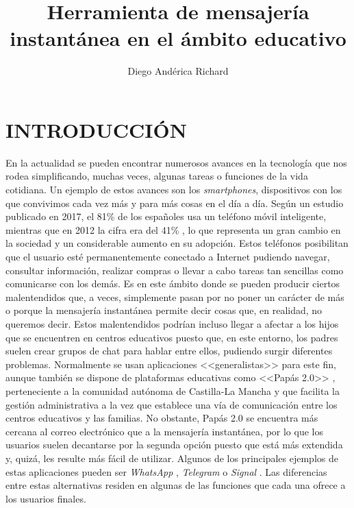 \documentclass{pre-tfg}
\title{Herramienta de mensajería instantánea en el ámbito educativo}
\author{Diego Andérica Richard}
\begin{document}
	
\renewcommand{\tablename}{Tabla}

\maketitle
\tableofcontents

\newpage

\section{INTRODUCCIÓN}

En la actualidad se pueden encontrar numerosos avances en la tecnología que nos rodea simplificando, muchas veces, algunas tareas o funciones de la vida cotidiana. Un ejemplo de estos avances son los \textit{smartphones}, dispositivos con los que convivimos cada vez más y para más cosas en el día a día. Según un estudio publicado en 2017, el 81\% de los españoles usa un teléfono móvil inteligente, mientras que en 2012 la cifra era del 41\% \cite{Justo2017}, lo que representa un gran cambio en la sociedad y un considerable aumento en su adopción. Estos teléfonos posibilitan que el usuario esté permanentemente conectado a Internet pudiendo navegar, consultar información, realizar compras o llevar a cabo tareas tan sencillas como comunicarse con los demás. Es en este ámbito donde se pueden producir ciertos malentendidos que, a veces, simplemente pasan por no poner un carácter de más o porque la mensajería instantánea permite decir cosas que, en realidad, no queremos decir. Estos malentendidos podrían incluso llegar a afectar a los hijos que se encuentren en centros educativos puesto que, en este entorno, los padres suelen crear grupos de chat para hablar entre ellos, pudiendo surgir diferentes problemas. Normalmente se usan aplicaciones <<generalistas>> para este fin, aunque también se dispone de plataformas educativas como <<Papás 2.0>> \cite{JCCM2017}, perteneciente a la comunidad autónoma de Castilla-La Mancha y que facilita la gestión administrativa a la vez que establece una vía de comunicación entre los centros educativos y las familias. No obstante, Papás 2.0 se encuentra más cercana al correo electrónico que a la mensajería instantánea, por lo que los usuarios suelen decantarse por la segunda opción puesto que está más extendida y, quizá, les resulte más fácil de utilizar. Algunos de los principales ejemplos de estas aplicaciones pueden ser \textit{WhatsApp} \cite{WhatsApp}, \textit{Telegram} \cite{Telegram2017} o \textit{Signal} \cite{Signal}. Las diferencias entre estas alternativas residen en algunas de las funciones que cada una ofrece a los usuarios finales.
\end{document}
